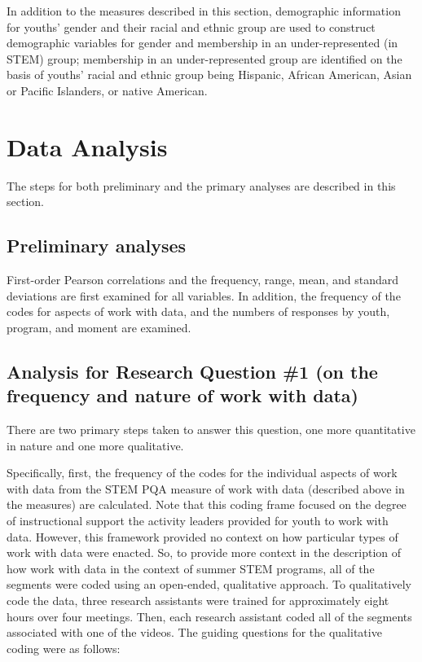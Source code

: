 \documentclass[]{book}
\theoremstyle{definition}
\theoremstyle{definition}
\theoremstyle{definition}
\theoremstyle{remark}
\begin{document}
In addition to the measures described in this section, demographic
information for youths' gender and their racial and ethnic group are
used to construct demographic variables for gender and membership in an
under-represented (in STEM) group; membership in an under-represented
group are identified on the basis of youths' racial and ethnic group
being Hispanic, African American, Asian or Pacific Islanders, or native
American.

\section{Data Analysis}\label{data-analysis}

The steps for both preliminary and the primary analyses are described in
this section.

\subsection{Preliminary analyses}\label{preliminary-analyses}

First-order Pearson correlations and the frequency, range, mean, and
standard deviations are first examined for all variables. In addition,
the frequency of the codes for aspects of work with data, and the
numbers of responses by youth, program, and moment are examined.

\subsection{Analysis for Research Question \#1 (on the frequency and
nature of work with
data)}\label{analysis-for-research-question-1-on-the-frequency-and-nature-of-work-with-data}

There are two primary steps taken to answer this question, one more
quantitative in nature and one more qualitative.

Specifically, first, the frequency of the codes for the individual
aspects of work with data from the STEM PQA measure of work with data
(described above in the measures) are calculated. Note that this coding
frame focused on the degree of instructional support the activity
leaders provided for youth to work with data. However, this framework
provided no context on how particular types of work with data were
enacted. So, to provide more context in the description of how work with
data in the context of summer STEM programs, all of the segments were
coded using an open-ended, qualitative approach. To qualitatively code
the data, three research assistants were trained for approximately eight
hours over four meetings. Then, each research assistant coded all of the
segments associated with one of the videos. The guiding questions for
the qualitative coding were as follows:
\end{document}
